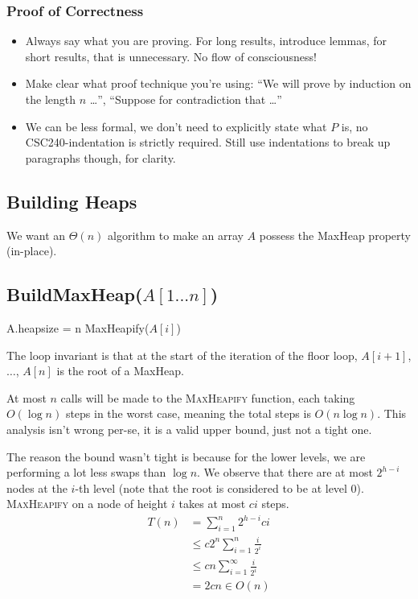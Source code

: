 \subsubsection*{Proof of Correctness}
\begin{itemize}
    \item Always say what you are proving. For long results, introduce lemmas, for short results, that is unnecessary. No flow of consciousness!
    \item Make clear what proof technique you're using: ``We will prove by induction on the length $n$ \dots '', ``Suppose for contradiction that \dots''
    \item We can be less formal, we don't need to explicitly state what $P$ is, no CSC240-indentation is strictly required. Still use indentations to break up paragraphs though, for clarity.
\end{itemize}

\newpage
\subsection{Building Heaps}

We want an $\Theta(n)$ algorithm to make an array $A$ possess the MaxHeap property (in-place). 

\subsection*{BuildMaxHeap($A[1...n]$)}
\begin{algorithmic}[1]
\State A.heapsize = n
    \State MaxHeapify($A[i]$)
\EndFor
\end{algorithmic}
The loop invariant is that at the start of the iteration of the floor loop, $A[i+1]$, $\dots$, $A[n]$ is the root of a MaxHeap. 

At most $n$ calls will be made to the \textsc{MaxHeapify} function, each taking $O(\log n)$ steps in the worst case, meaning the total steps is $O(n \log n)$. This analysis isn't wrong per-se, it is a valid upper bound, just not a tight one.

The reason the bound wasn't tight is because for the lower levels, we are performing a lot less swaps than $\log n$. We observe that there are at most $2^{h - i}$ nodes at the $i$-th level (note that the root is considered to be at level 0). \textsc{MaxHeapify} on a node of height $i$ takes at most $ci$ steps.
\begin{align*}
    T(n) &= \sum_{i=1}^{n} 2^{h-i} ci \\
    &\leq c 2^n \sum_{i=1}^{n} \frac{i}{2^i} \\
    &\leq cn \sum_{i=1}^{\infty} \frac{i}{2^i} \\
    &= 2cn \in O(n)
\end{align*}

